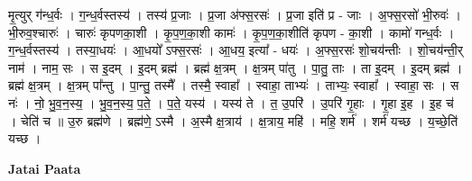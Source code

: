 \documentclass[17pt]{extarticle}
\begin{document}
मृ॒त्युर् ग॑न्ध॒र्वः । ग॒न्ध॒र्वस्तस्य॑ । तस्य॑ प्र॒जाः । प्र॒जा अ॑फ्स॒रसः॑ । प्र॒जा इति॑ प्र - जाः । अ॒फ्स॒रसो॑ भी॒रुवः॑ । भी॒रुव॒श्चारुः॑ । चारुः॑ कृपणका॒शी । कृ॒प॒ण॒का॒शी कामः॑ । कृ॒प॒ण॒का॒शीति॑ कृपण - का॒शी । कामो॑ गन्ध॒र्वः । ग॒न्ध॒र्वस्तस्य॑ । तस्या॒धयः॑ । आ॒धयो᳚ ऽफ्स॒रसः॑ । आ॒धय॒ इत्या᳚ - धयः॑ । अ॒फ्स॒रसः॑ शो॒चय॑न्तीः । शो॒चय॑न्ती॒र् नाम॑ । नाम॒ सः । स इ॒दम् । इ॒दम् ब्रह्म॑ । ब्रह्म॑ क्ष॒त्रम् । क्ष॒त्रम् पा॑तु । पा॒तु॒ ताः । ता इ॒दम् । इ॒दम् ब्रह्म॑ । ब्रह्म॑ क्ष॒त्रम् । क्ष॒त्रम् पा᳚न्तु । पा॒न्तु॒ तस्मै᳚ । तस्मै॒ स्वाहा᳚ । स्वाहा॒ ताभ्यः॑ । ताभ्यः॒ स्वाहा᳚ । स्वाहा॒ सः । स नः॑ । नो॒ भु॒व॒न॒स्य॒ । भु॒व॒न॒स्य॒ प॒ते॒ । प॒ते॒ यस्य॑ । यस्य॑ ते । त॒ उ॒परि॑ । उ॒परि॑ गृ॒हाः । गृ॒हा इ॒ह । इ॒ह च॑ । चेति॑ च ॥ उ॒रु ब्रह्म॑णे । ब्रह्म॑णे॒ ऽस्मै । अ॒स्मै क्ष॒त्राय॑ । क्ष॒त्राय॒ महि॑ । महि॒ शर्म॑ । शर्म॑ यच्छ । य॒च्छे॒ति॑ यच्छ । \newline

\textbf{Jatai Paata} \newline
\end{document}
